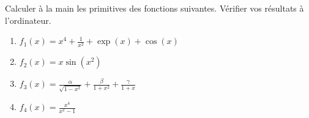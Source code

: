 \begin{frame}
\begin{tp}
Calculer à la main les primitives des fonctions suivantes. 
Vérifier vos résultats à l'ordinateur.

\medskip

\begin{enumerate}
  \item $f_1(x) = x^4 + \frac{1}{x^2} + \exp(x)+ \cos(x)$
  
  \medskip
  
  \item $f_2(x) = x \sin(x^2)$
  
  \medskip
   
  \item $f_3(x) = \frac{\alpha}{\sqrt{1-x^2}} + \frac{\beta}{1+x^2} + \frac{\gamma}{1+x}$
  
  \medskip
  
  \item $f_4(x) = \frac{x^4}{x^2-1}$ 
  
  
\end{enumerate}
\end{tp}

\end{frame}

